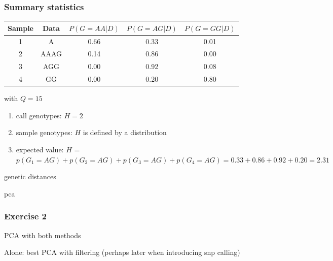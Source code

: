 \begin{frame}
\frametitle{Summary statistics}

        \tiny{
        \begin{center}
                \begin{tabular}{c | c | c | c | c}
                        Sample & Data & $P(G=AA|D)$ & $P(G=AG|D)$ & $P(G=GG|D)$\\
                        \hline
                        1 & A & 0.66 & 0.33 & 0.01\\
                        2 & AAAG & 0.14 & 0.86 & 0.00\\
                        3 & AGG & 0.00 & 0.92 & 0.08\\
                        4 & GG & 0.00 & 0.20 & 0.80\\
                        \hline
                \end{tabular}
                with $Q=15$
        \end{center}
        }

	\large{
	\begin{enumerate}
                \item call genotypes: $H=2$
                \item sample genotypes: $H$ is defined by a distribution
		\item expected value: $\hat{H}$ = \pause $p(G_1=AG) + p(G_2=AG) + p(G_3=AG) + p(G_4=AG) = 0.33+0.86+0.92+0.20 = 2.31$
        \end{enumerate}
	}

\end{frame}



\begin{frame}

	genetic distances

\end{frame}


\begin{frame}

	pca

\end{frame}


\begin{frame}
\frametitle{Exercise 2}

	PCA with both methods

	Alone: best PCA with filtering (perhaps later when introducing snp calling)

\end{frame}







